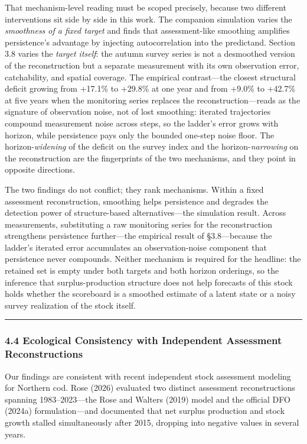\documentclass[11pt]{article}
\begin{document}
That mechanism-level reading must be scoped precisely, because two
different interventions sit side by side in this work. The companion
simulation varies the \emph{smoothness of a fixed target} and finds that
assessment-like smoothing amplifies persistence's advantage by injecting
autocorrelation into the predictand. Section 3.8 varies the \emph{target
itself}: the autumn survey series is not a desmoothed version of the
reconstruction but a separate measurement with its own observation
error, catchability, and spatial coverage. The empirical contrast---the
closest structural deficit growing from +17.1\% to +29.8\% at one year
and from +9.0\% to +42.7\% at five years when the monitoring series
replaces the reconstruction---reads as the signature of observation
noise, not of lost smoothing: iterated trajectories compound measurement
noise across steps, so the ladder's error grows with horizon, while
persistence pays only the bounded one-step noise floor. The
horizon-\emph{widening} of the deficit on the survey index and the
horizon-\emph{narrowing} on the reconstruction are the fingerprints of
the two mechanisms, and they point in opposite directions.

The two findings do not conflict; they rank mechanisms. Within a fixed
assessment reconstruction, smoothing helps persistence and degrades the
detection power of structure-based alternatives---the simulation result.
Across measurements, substituting a raw monitoring series for the
reconstruction strengthens persistence further---the empirical result of
§3.8---because the ladder's iterated error accumulates an
observation-noise component that persistence never compounds. Neither
mechanism is required for the headline: the retained set is empty under
both targets and both horizon orderings, so the inference that
surplus-production structure does not help forecasts of this stock holds
whether the scoreboard is a smoothed estimate of a latent state or a
noisy survey realization of the stock itself.

\begin{center}\rule{0.5\linewidth}{0.5pt}\end{center}

\subsubsection{4.4 Ecological Consistency with Independent Assessment
Reconstructions}\label{ecological-consistency-with-independent-assessment-reconstructions}

Our findings are consistent with recent independent stock assessment
modeling for Northern cod. Rose (2026) evaluated two distinct assessment
reconstructions spanning 1983--2023---the Rose and Walters (2019) model
and the official DFO (2024a) formulation---and documented that net
surplus production and stock growth stalled simultaneously after 2015,
dropping into negative values in several years.
\end{document}
